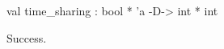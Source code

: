 \chklistingtrue
{}
\begin{ChkListingMsg}
val time_sharing : bool * 'a -D-> int * int
\end{ChkListingMsg}
\begin{ChkListingErr}
Success.
\end{ChkListingErr}
